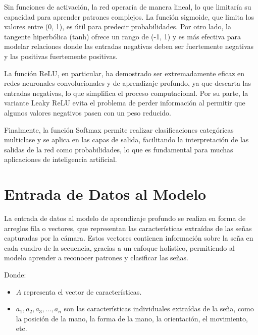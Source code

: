 Sin funciones de activación, la red operaría de manera lineal, lo que limitaría su capacidad para aprender patrones complejos. La función sigmoide, que limita los valores entre (0, 1), es útil para predecir probabilidades. Por otro lado, la tangente hiperbólica (tanh) ofrece un rango de (-1, 1) y es más efectiva para modelar relaciones donde las entradas negativas deben ser fuertemente negativas y las positivas fuertemente positivas.

La función ReLU, en particular, ha demostrado ser extremadamente eficaz en redes neuronales convolucionales y de aprendizaje profundo, ya que descarta las entradas negativas, lo que simplifica el proceso computacional. Por su parte, la variante Leaky ReLU evita el problema de perder información al permitir que algunos valores negativos pasen con un peso reducido.

Finalmente, la función Softmax permite realizar clasificaciones categóricas multiclase y se aplica en las capas de salida, facilitando la interpretación de las salidas de la red como probabilidades, lo que es fundamental para muchas aplicaciones de inteligencia artificial.

\section{Entrada de Datos al Modelo}

La entrada de datos al modelo de aprendizaje profundo se realiza en forma de arreglos fila o vectores, que representan las características extraídas de las señas capturadas por la cámara. Estos vectores contienen información sobre la seña en cada cuadro de la secuencia, gracias a un enfoque holístico, permitiendo al modelo aprender a reconocer patrones y clasificar las señas\cite{ref38}.


Donde:

\begin{itemize}
    \item $A$ representa el vector de características.
    \item $a_1, a_2, a_3, \ldots, a_n$ son las características individuales extraídas de la seña, como la posición de la mano, la forma de la mano, la orientación, el movimiento, etc.
\end{itemize}

